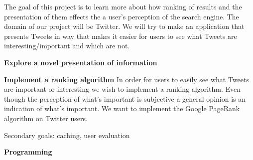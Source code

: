 The goal of this project is to learn more about how ranking of results and the presentation of them effects the a user's perception of the search engine. The domain of our project will be Twitter. We will try to make an application that presents Tweets in way that makes it easier for users to see what Tweets are interesting/important and which are not. 



{\bf Explore a novel presentation of information}\newline



{\bf Implement a ranking algorithm}\newline %
In order for users to easily see what Tweets are important or interesting we wish to implement a ranking algorithm. Even though the perception of what's important is subjective a general opinion is an indication of what's important. We want to implement the Google PageRank algorithm on Twitter users.

Secondary goals: caching, user evaluation

{\bf Programming}\newline

